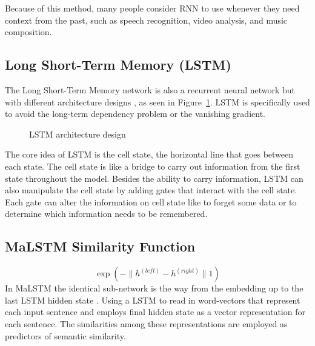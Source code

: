 \documentclass[12pt,oneside,openright,a4paper]{cpe-english-project}
\begin{document}
Because of this method, many people consider RNN to use whenever they need context from the past,
such as speech recognition, video analysis, and music composition.

\subsection{Long Short-Term Memory (LSTM)}
The Long Short-Term Memory network is also a recurrent neural network but with
different architecture designs \cite{understand_rnn}, as seen in Figure~\ref*{fig:lstm_arch_design}.
LSTM is specifically used to avoid the long-term dependency problem or the vanishing gradient.

\begin{figure}[!h] \centering
  \setlength{\fboxrule}{0.2mm}
  \setlength{\fboxsep}{0.5cm}
  \caption{LSTM architecture design}
  \label{fig:lstm_arch_design}
\end{figure}

The core idea of LSTM is the cell state, the horizontal line that goes between each state. The
cell state is like a bridge to carry out information from the first state throughout the model.
Besides the ability to carry information, LSTM can also manipulate the cell state by adding gates
that interact with the cell state. Each gate can alter the information on cell state like
to forget some data or to determine which information needs to be remembered. 

\subsection{MaLSTM Similarity Function}
\[\exp(-\|h^{(left)} - h^{(right)}\|1)\]
In MaLSTM the identical sub-network is the way from the embedding up to the last LSTM hidden
state \cite{manhattan_lstm, what_is_embedding_matrix}. Using a LSTM to read in word-vectors that represent each
input sentence and employs final hidden state as a vector representation for each sentence.
The similarities among these representations are employed as predictors of semantic similarity.
\end{document}

